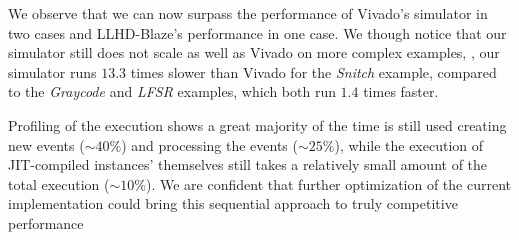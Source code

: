 We observe that we can now surpass the performance of Vivado's simulator in two cases and LLHD-Blaze's performance in one case. We though notice that our simulator still does not scale as well as Vivado on more complex examples, \eg, our simulator runs $13.3$ times slower than Vivado for the \textit{Snitch} example, compared to the \textit{Graycode} and \textit{LFSR} examples, which both run $1.4$ times faster.

Profiling of the execution shows a great majority of the time is still used creating new events ($\sim$$40\%$) and processing the events ($\sim$$25\%$), while the execution of JIT-compiled instances' themselves still takes a relatively small amount of the total execution ($\sim$$10\%$). We are confident that further optimization of the current implementation could bring this sequential approach to truly competitive performance
